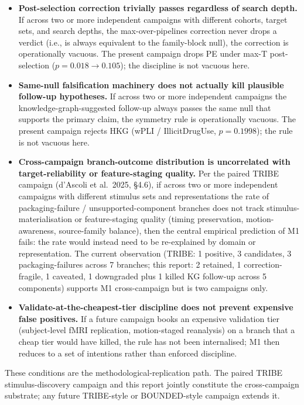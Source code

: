 \documentclass[11pt,letterpaper]{report}
\begin{document}
\begin{itemize}[leftmargin=1.6em,itemsep=0.2em]
\item \textbf{Post-selection correction trivially passes regardless of search depth.} If across two or more independent campaigns with different cohorts, target sets, and search depths, the max-over-pipelines correction never drops a verdict (i.e., is always equivalent to the family-block null), the correction is operationally vacuous. The present campaign drops PE under max-T post-selection ($p = 0.018 \rightarrow 0.105$); the discipline is not vacuous here.
\item \textbf{Same-null falsification machinery does not actually kill plausible follow-up hypotheses.} If across two or more independent campaigns the knowledge-graph-suggested follow-up always passes the same null that supports the primary claim, the symmetry rule is operationally vacuous. The present campaign rejects HKG (wPLI / IllicitDrugUse, $p = 0.1998$); the rule is not vacuous here.
\item \textbf{Cross-campaign branch-outcome distribution is uncorrelated with target-reliability or feature-staging quality.} Per the paired TRIBE campaign (d'Ascoli et al.\ 2025, \S 4.6), if across two or more independent campaigns with different stimulus sets and representations the rate of packaging-failure / unsupported-component branches does not track stimulus-materialisation or feature-staging quality (timing preservation, motion-awareness, source-family balance), then the central empirical prediction of M1 fails: the rate would instead need to be re-explained by domain or representation. The current observation (TRIBE: 1 positive, 3 candidates, 3 packaging-failures across 7 branches; this report: 2 retained, 1 correction-fragile, 1 caveated, 1 downgraded plus 1 killed KG follow-up across 5 components) supports M1 cross-campaign but is two campaigns only.
\item \textbf{Validate-at-the-cheapest-tier discipline does not prevent expensive false positives.} If a future campaign books an expensive validation tier (subject-level fMRI replication, motion-staged reanalysis) on a branch that a cheap tier would have killed, the rule has not been internalised; M1 then reduces to a set of intentions rather than enforced discipline.
\end{itemize}

These conditions are the methodological-replication path. The paired TRIBE stimulus-discovery campaign and this report jointly constitute the cross-campaign substrate; any future TRIBE-style or BOUNDED-style campaign extends it.
\end{document}
